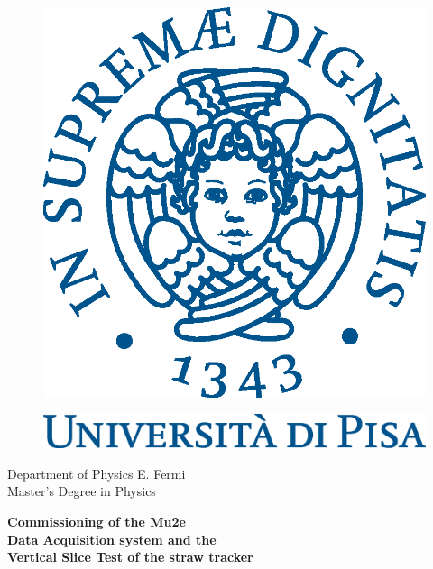 \begin{titlepage}
\begin{figure}[!htb]
    \centering
    \includegraphics[keepaspectratio=true,scale=0.5]{figures/eps/cherubinFrontespizio.eps}
\end{figure}
\begin{figure}[!htb]
    \centering
    \includegraphics[keepaspectratio=true,scale=0.5]{figures/eps/logo_pant541.eps}
\end{figure}

\begin{center}
     \Large{Department of Physics E. Fermi}
    \vspace{5mm}
    \\ \Large{Master's Degree in Physics}
\end{center}

\vspace{15mm}
\begin{center}
    {\LARGE{\bf Commissioning of the Mu2e\\ \vspace{3mm} Data Acquisition system and the\\ \vspace{5mm} Vertical Slice Test of the straw tracker}}
    

\end{center}
\end{titlepage}
